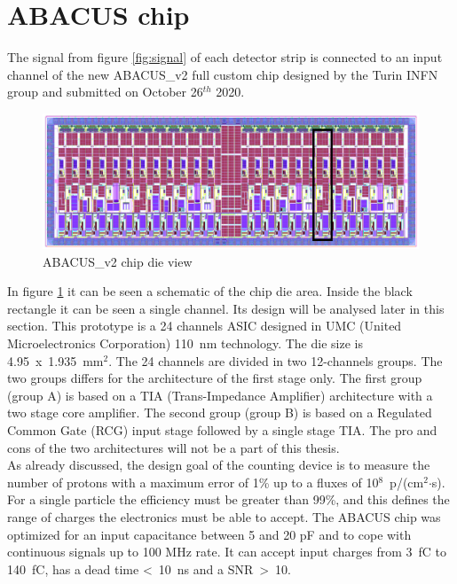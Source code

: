 \section{ABACUS chip}\label{chip}
\noindent The signal from figure \ref{fig:signal} of each detector strip is connected to an input channel of the new ABACUS\_v2 full custom chip\cite{abacus}\cite{dac} designed by the Turin INFN group and submitted on October 26$^{th}$ 2020.
\begin{figure}[H]
	\centering
	\includegraphics[width=0.9\linewidth]{IMG/ch2/ABACUS2.png}
	\caption{ABACUS\_v2 chip die view}
	\label{fig:abacus2}
\end{figure}
\noindent In figure \ref{fig:abacus2} it can be seen a schematic of the chip die area. Inside the black rectangle it can be seen a single channel. Its design will be analysed later in this section.
This prototype is a 24 channels ASIC designed in UMC (United Microelectronics Corporation) 110~nm technology.
The die size is 4.95~x~1.935~mm$^2$.
The 24 channels are divided in two 12-channels groups. The two groups differs for the architecture of the first stage only.
The first group (group A) is based on a TIA (Trans-Impedance Amplifier) architecture with a two stage core amplifier.
The second group (group B) is based on a Regulated Common Gate (RCG) input stage followed by a single stage TIA.
The pro and cons of the two architectures will not be a part of this thesis.\\
As already discussed, the design goal of the counting device is to measure the number of protons with a maximum error of 1\% up to a fluxes of 10$^8$~p/(cm$^2$$\cdot$s).
For a single particle the efficiency must be greater than 99\%, and this defines the range of charges the electronics must be able to accept.
The ABACUS chip was optimized for an input capacitance between 5 and 20 pF and to cope with continuous signals up to 100 MHz rate.
It can accept input charges from 3~fC to 140~fC, has a dead time <~10~ns and a SNR~>~10. 

